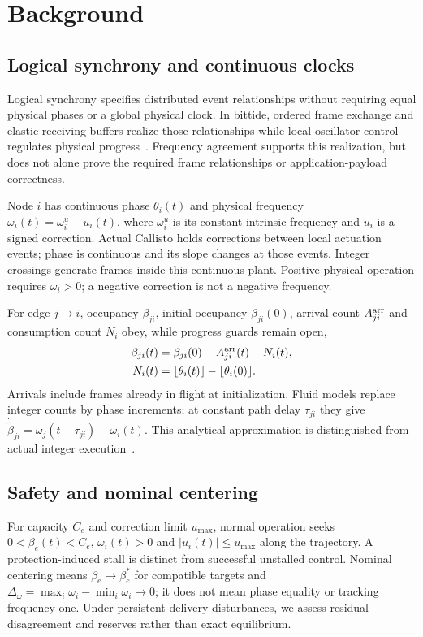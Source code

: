 \section{Background}
\label{sec:background}

\subsection{Logical synchrony and continuous clocks}
Logical synchrony specifies distributed event relationships without
requiring equal physical phases or a global physical clock.
In bittide, ordered frame exchange and elastic receiving buffers
realize those relationships while local oscillator control regulates
physical progress~\cite{lall2024logicalSynchrony}. Frequency agreement
supports this realization, but does not alone prove the required
frame relationships or application-payload correctness.

Node $i$ has continuous phase $\theta_i(t)$ and physical frequency
$\omega_i(t)=\omega_i^u+u_i(t)$, where $\omega_i^u$ is its constant
intrinsic frequency and $u_i$ is a signed correction. Actual Callisto
holds corrections between local actuation events; phase is continuous
and its slope changes at those events. Integer crossings generate
frames inside this continuous plant. Positive physical operation
requires $\omega_i>0$; a negative correction is not a negative frequency.

For edge $j\to i$, occupancy $\beta_{ji}$, initial occupancy
$\beta_{ji}(0)$, arrival count $A_{ji}^{\rm arr}$ and consumption
count $N_i$ obey, while progress guards remain open,
\begin{align}
 \beta_{ji}(t)&=\beta_{ji}(0)+A_{ji}^{\rm arr}(t)-N_i(t),\nonumber\\
 N_i(t)&=\lfloor\theta_i(t)\rfloor-\lfloor\theta_i(0)\rfloor.
 \label{eq:bg_count_balance}
\end{align}
Arrivals include frames already in flight at initialization. Fluid
models replace integer counts by phase increments; at constant path
delay $\tau_{ji}$ they give
$\dot{\widetilde\beta}_{ji}=\omega_j(t-\tau_{ji})-\omega_i(t)$.
This analytical approximation is distinguished from actual integer
execution~\cite{lall2022resistance,lall2024bufferOccupancy}.

\subsection{Safety and nominal centering}
For capacity $C_e$ and correction limit $u_{\max}$, normal operation
seeks $0<\beta_e(t)<C_e$, $\omega_i(t)>0$ and
$|u_i(t)|\le u_{\max}$ along the trajectory. A protection-induced
stall is distinct from successful unstalled control. Nominal centering
means $\beta_e\to\beta_e^*$ for compatible targets and
$\Delta_\omega=\max_i\omega_i-\min_i\omega_i\to0$; it does not
mean phase equality or tracking frequency one. Under persistent
delivery disturbances, we assess residual disagreement and reserves
rather than exact equilibrium.

